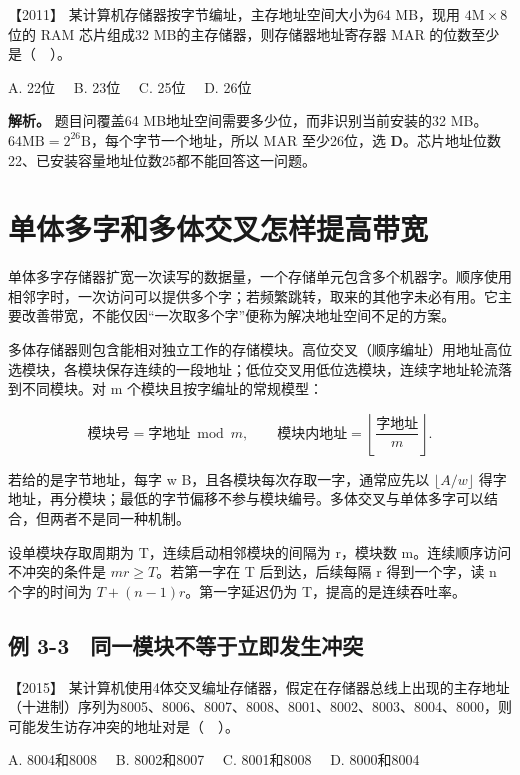 \noindent{}【2011】 某计算机存储器按字节编址，主存地址空间大小为64 MB，现用 \(4\mathrm M\times8\) 位的 RAM 芯片组成32 MB的主存储器，则存储器地址寄存器 MAR 的位数至少是（　）。

A. 22位　 B. 23位　 C. 25位　 D. 26位


\textbf{解析。} 题目问覆盖64 MB地址空间需要多少位，而非识别当前安装的32 MB。\(64\mathrm{MB}=2^{26}\mathrm B\)，每个字节一个地址，所以 MAR 至少26位，选 \textbf{D}。芯片地址位数22、已安装容量地址位数25都不能回答这一问题。

\section{单体多字和多体交叉怎样提高带宽}\label{co-03-04}

单体多字存储器扩宽一次读写的数据量，一个存储单元包含多个机器字。顺序使用相邻字时，一次访问可以提供多个字；若频繁跳转，取来的其他字未必有用。它主要改善带宽，不能仅因``一次取多个字''便称为解决地址空间不足的方案。

多体存储器则包含能相对独立工作的存储模块。高位交叉（顺序编址）用地址高位选模块，各模块保存连续的一段地址；低位交叉用低位选模块，连续字地址轮流落到不同模块。对 m 个模块且按字编址的常规模型：

\[
\text{模块号}=\text{字地址}\bmod m,\qquad
\text{模块内地址}=\left\lfloor\frac{\text{字地址}}m\right\rfloor.
\]

若给的是字节地址，每字 w B，且各模块每次存取一字，通常应先以 \(\lfloor A/w\rfloor\) 得字地址，再分模块；最低的字节偏移不参与模块编号。多体交叉与单体多字可以结合，但两者不是同一种机制。

设单模块存取周期为 T，连续启动相邻模块的间隔为 r，模块数 m。连续顺序访问不冲突的条件是 \(mr\ge T\)。若第一字在 T 后到达，后续每隔 r 得到一个字，读 n 个字的时间为 \(T+(n-1)r\)。第一字延迟仍为 T，提高的是连续吞吐率。

\subsection{例 3-3　同一模块不等于立即发生冲突}\label{co-ex3-3}

\noindent{}【2015】 某计算机使用4体交叉编址存储器，假定在存储器总线上出现的主存地址（十进制）序列为8005、8006、8007、8008、8001、8002、8003、8004、8000，则可能发生访存冲突的地址对是（　）。

A. 8004和8008　 B. 8002和8007　 C. 8001和8008　 D. 8000和8004


